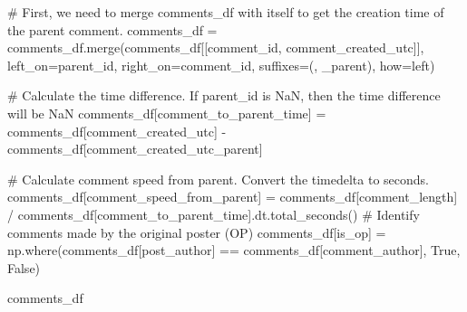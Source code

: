 \documentclass[
  12pt,
  letterpaper,
  DIV=11,
  numbers=noendperiod]{scrartcl}
\newenvironment{Shaded}{\begin{snugshade}}{\end{snugshade}}
\newcommand{\CommentTok}[1]{\textcolor[rgb]{0.37,0.37,0.37}{#1}}
\newcommand{\NormalTok}[1]{\textcolor[rgb]{0.00,0.23,0.31}{#1}}
\newcommand{\OperatorTok}[1]{\textcolor[rgb]{0.37,0.37,0.37}{#1}}
\newcommand{\StringTok}[1]{\textcolor[rgb]{0.13,0.47,0.30}{#1}}
\newcommand{\VariableTok}[1]{\textcolor[rgb]{0.07,0.07,0.07}{#1}}
\begin{document}
\begin{Shaded}
\begin{Highlighting}[]
\CommentTok{\# First, we need to merge comments\_df with itself to get the creation time of the parent comment.}
\NormalTok{comments\_df }\OperatorTok{=}\NormalTok{ comments\_df.merge(comments\_df[[}\StringTok{\textquotesingle{}comment\_id\textquotesingle{}}\NormalTok{, }\StringTok{\textquotesingle{}comment\_created\_utc\textquotesingle{}}\NormalTok{]], left\_on}\OperatorTok{=}\StringTok{\textquotesingle{}parent\_id\textquotesingle{}}\NormalTok{, right\_on}\OperatorTok{=}\StringTok{\textquotesingle{}comment\_id\textquotesingle{}}\NormalTok{, suffixes}\OperatorTok{=}\NormalTok{(}\StringTok{\textquotesingle{}\textquotesingle{}}\NormalTok{, }\StringTok{\textquotesingle{}\_parent\textquotesingle{}}\NormalTok{), how}\OperatorTok{=}\StringTok{\textquotesingle{}left\textquotesingle{}}\NormalTok{)}

\CommentTok{\# Calculate the time difference.  If parent\_id is NaN, then the time difference will be NaN}
\NormalTok{comments\_df[}\StringTok{\textquotesingle{}comment\_to\_parent\_time\textquotesingle{}}\NormalTok{] }\OperatorTok{=}\NormalTok{ comments\_df[}\StringTok{\textquotesingle{}comment\_created\_utc\textquotesingle{}}\NormalTok{] }\OperatorTok{{-}}\NormalTok{ comments\_df[}\StringTok{\textquotesingle{}comment\_created\_utc\_parent\textquotesingle{}}\NormalTok{]}

\CommentTok{\# Calculate comment speed from parent. Convert the timedelta to seconds.}
\NormalTok{comments\_df[}\StringTok{\textquotesingle{}comment\_speed\_from\_parent\textquotesingle{}}\NormalTok{] }\OperatorTok{=}\NormalTok{ comments\_df[}\StringTok{\textquotesingle{}comment\_length\textquotesingle{}}\NormalTok{] }\OperatorTok{/}\NormalTok{ comments\_df[}\StringTok{\textquotesingle{}comment\_to\_parent\_time\textquotesingle{}}\NormalTok{].dt.total\_seconds()}
\CommentTok{\# Identify comments made by the original poster (OP)}
\NormalTok{comments\_df[}\StringTok{\textquotesingle{}is\_op\textquotesingle{}}\NormalTok{] }\OperatorTok{=}\NormalTok{ np.where(comments\_df[}\StringTok{\textquotesingle{}post\_author\textquotesingle{}}\NormalTok{] }\OperatorTok{==}\NormalTok{ comments\_df[}\StringTok{\textquotesingle{}comment\_author\textquotesingle{}}\NormalTok{], }\VariableTok{True}\NormalTok{, }\VariableTok{False}\NormalTok{)}

\NormalTok{comments\_df}
\end{Highlighting}
\end{Shaded}
\end{document}
